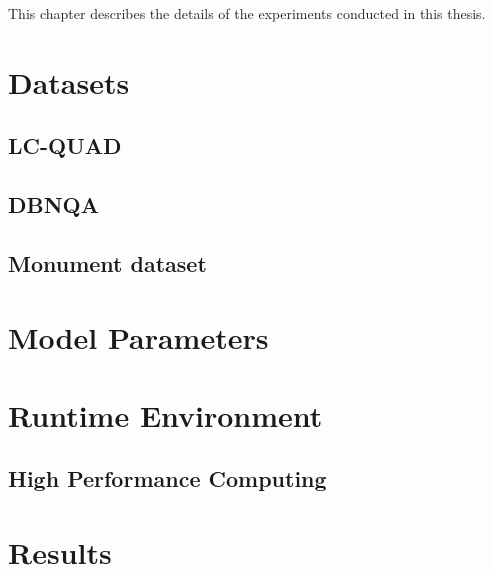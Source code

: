 
This chapter describes the details of the experiments conducted in this thesis. 

\section{Datasets} \label{section:datasets}

\subsection{LC-QUAD}

\subsection{DBNQA}

\subsection{Monument dataset}

\section{Model Parameters} \label{section:model parameters}

\section{Runtime Environment} \label{section:runtime environment}

\subsection{High Performance Computing} \label{subsection:hpc}

\section{Results} \label{section:results}